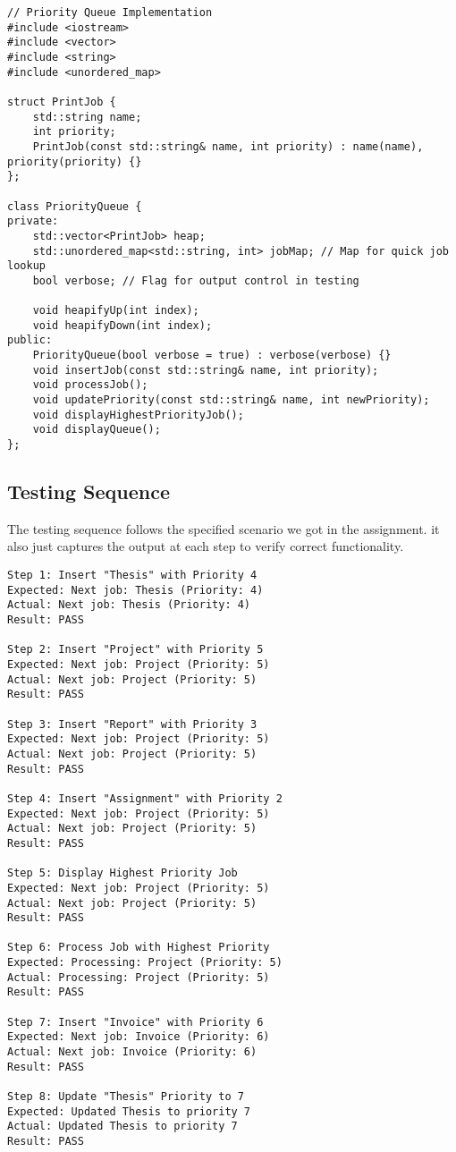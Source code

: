 \documentclass{article}
\begin{document}
\begin{lstlisting}
// Priority Queue Implementation
#include <iostream>
#include <vector>
#include <string>
#include <unordered_map>

struct PrintJob {
    std::string name;
    int priority;
    PrintJob(const std::string& name, int priority) : name(name), priority(priority) {}
};

class PriorityQueue {
private:
    std::vector<PrintJob> heap;
    std::unordered_map<std::string, int> jobMap; // Map for quick job lookup
    bool verbose; // Flag for output control in testing

    void heapifyUp(int index);
    void heapifyDown(int index);
public:
    PriorityQueue(bool verbose = true) : verbose(verbose) {}
    void insertJob(const std::string& name, int priority);
    void processJob();
    void updatePriority(const std::string& name, int newPriority);
    void displayHighestPriorityJob();
    void displayQueue();
};
\end{lstlisting}

\subsection{Testing Sequence}
The testing sequence follows the specified scenario we got in the assignment. it also just captures the output at each step to verify correct functionality. 

\begin{verbatim}
Step 1: Insert "Thesis" with Priority 4
Expected: Next job: Thesis (Priority: 4)
Actual: Next job: Thesis (Priority: 4)
Result: PASS

Step 2: Insert "Project" with Priority 5
Expected: Next job: Project (Priority: 5)
Actual: Next job: Project (Priority: 5)
Result: PASS

Step 3: Insert "Report" with Priority 3
Expected: Next job: Project (Priority: 5)
Actual: Next job: Project (Priority: 5)
Result: PASS

Step 4: Insert "Assignment" with Priority 2
Expected: Next job: Project (Priority: 5)
Actual: Next job: Project (Priority: 5)
Result: PASS

Step 5: Display Highest Priority Job
Expected: Next job: Project (Priority: 5)
Actual: Next job: Project (Priority: 5)
Result: PASS

Step 6: Process Job with Highest Priority
Expected: Processing: Project (Priority: 5)
Actual: Processing: Project (Priority: 5)
Result: PASS

Step 7: Insert "Invoice" with Priority 6
Expected: Next job: Invoice (Priority: 6)
Actual: Next job: Invoice (Priority: 6)
Result: PASS

Step 8: Update "Thesis" Priority to 7
Expected: Updated Thesis to priority 7
Actual: Updated Thesis to priority 7
Result: PASS
\end{verbatim}
\end{document}
